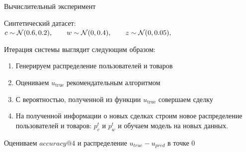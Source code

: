 \documentclass{beamer}
\begin{document}

\begin{frame}{Вычислительный эксперимент}

    Синтетический датасет:
        $\\
        c \sim \mathcal{N}(0.6, 0.2), \qquad
        w \sim \mathcal{N}(0, 0.4),  \qquad
        z \sim \mathcal{N}(0, 0.05),  \qquad
        $

    Итерация системы выглядит следующим образом:
    \begin{enumerate}
        \item Генерируем распределение пользователей и товаров
        \item Оцениваем $u_{\text{true}}$ рекомендательным алгоритмом
        \item С вероятностью, полученной из функции $u_{\text{true}}$ совершаем сделку
        \item На полученной информации о новых сделках строим новое распределение пользователей и товаров: $p_c^t$ и $p_w^t$ и обучаем модель на новых данных.
    \end{enumerate}

    Оцениваем $accuracy@4$ и распределение $u_{true} - u_{pred}$ в точке 0

\end{frame}



\end{document}
